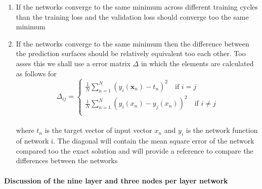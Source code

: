 \documentclass[12pt]{article}
\begin{document}
\begin{enumerate}
	\item If the networks converge to the same minimum across different training cycles than the training loss and the validation loss should converge too the same minimum
	\item If the networks converge to the same minimum then the difference between the prediction surfaces should be relatively equivalent too each other. Too asses this we shall use a error matrix $\Delta$ in which the elements are calculated as follows for 
	\\
	\begin{equation*}
	\Delta_{ij} =
	\begin{cases}
	\frac{1}{N} \sum_{n=1}^{N} \left(y_{i}(\textbf{x}_n)-t_n\right)^2 \quad \text{if } i=j \\
	\frac{1}{N} \sum_{n=1}^{N} \left(y_{i}(x_n)-y_{j}(x_n)\right)^2 \quad \text{if } i \neq j \\
	\end{cases}
	\end{equation*}
	\\
	where $t_n$ is the target vector of input vector $x_n$ and $y_i$ is the network function of network i. The diagonal will contain the mean square error of the network compared too the exact solution and will provide a reference to compare the differences between the networks
\end{enumerate}

\paragraph{Discussion of the nine layer and three nodes per layer network}
\end{document}
